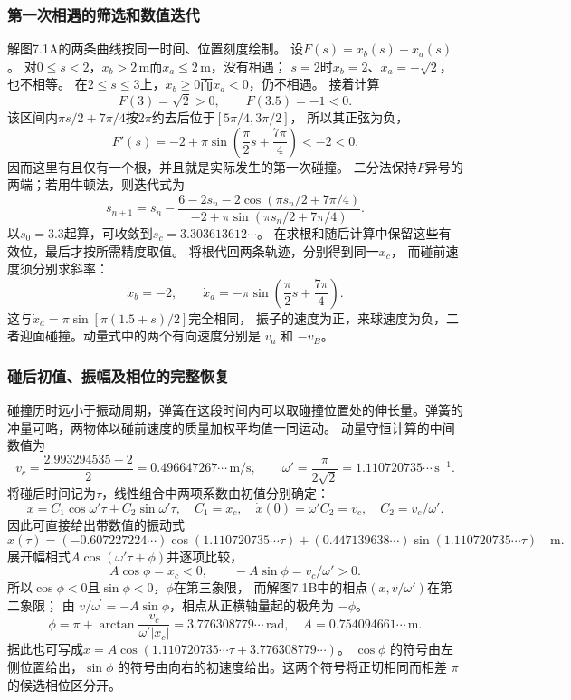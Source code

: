 \documentclass[UTF8,fontset=fandol,a4paper,11pt]{ctexart}
\begin{document}
\subsubsection*{第一次相遇的筛选和数值迭代}
解图7.1A的两条曲线按同一时间、位置刻度绘制。
设$F(s)=x_b(s)-x_a(s)$。
对$0\leq s<2$，$x_b>2\,\mathrm m$而$x_a\leq2\,\mathrm m$，没有相遇；
$s=2$时$x_b=2$、$x_a=-\sqrt2$，也不相等。
在$2\leq s\leq3$上，$x_b\geq0$而$x_a<0$，仍不相遇。
接着计算
\[
F(3)=\sqrt2>0,\qquad F(3.5)=-1<0.
\]
该区间内$\pi s/2+7\pi/4$按$2\pi$约去后位于$[5\pi/4,3\pi/2]$，
所以其正弦为负，
\[
F'(s)=-2+\pi\sin\left(\frac\pi2s+\frac{7\pi}4\right)<-2<0.
\]
因而这里有且仅有一个根，并且就是实际发生的第一次碰撞。
二分法保持$F$异号的两端；若用牛顿法，则迭代式为
\[
s_{n+1}=s_n-
\frac{6-2s_n-2\cos(\pi s_n/2+7\pi/4)}
{-2+\pi\sin(\pi s_n/2+7\pi/4)}.
\]
以$s_0=3.3$起算，可收敛到$s_c=3.303613612\cdots$。
在求根和随后计算中保留这些有效位，最后才按所需精度取值。
将根代回两条轨迹，分别得到同一$x_c$，
而碰前速度须分别求斜率：
\[
\dot x_b=-2,\qquad
\dot x_a=-\pi\sin\left(\frac\pi2s+\frac{7\pi}4\right).
\]
这与$\dot x_a=\pi\sin[\pi(1.5+s)/2]$完全相同，
振子的速度为正，来球速度为负，二者迎面碰撞。动量式中的两个有向速度分别是 $v_a$ 和 $-v_B$。

\subsubsection*{碰后初值、振幅及相位的完整恢复}
碰撞历时远小于振动周期，弹簧在这段时间内可以取碰撞位置处的伸长量。弹簧的冲量可略，两物体以碰前速度的质量加权平均值一同运动。
动量守恒计算的中间数值为
\[
v_c=\frac{2.993294535-2}{2}
=0.496647267\cdots\,\mathrm{m/s},
\qquad \omega'=\frac{\pi}{2\sqrt2}=1.110720735\cdots\,\mathrm{s}^{-1}.
\]
将碰后时间记为$\tau$，线性组合中两项系数由初值分别确定：
\[
x=C_1\cos\omega'\tau+C_2\sin\omega'\tau,
\quad C_1=x_c,
\quad \dot x(0)=\omega'C_2=v_c,
\quad C_2=v_c/\omega'.
\]
因此可直接给出带数值的振动式
\[
x(\tau)=
(-0.607227224\cdots)\cos(1.110720735\cdots\tau)
+(0.447139638\cdots)\sin(1.110720735\cdots\tau)
\quad\mathrm m.
\]
展开幅相式$A\cos(\omega'\tau+\phi)$并逐项比较，
\[
A\cos\phi=x_c<0,\qquad
-A\sin\phi=v_c/\omega'>0.
\]
所以$\cos\phi<0$且$\sin\phi<0$，$\phi$在第三象限，
而解图7.1B中的相点$(x,v/\omega')$在第二象限；
由 $v/\omega^{\prime}=-A\sin\phi$，相点从正横轴量起的极角为 $-\phi$。
\[
\phi=\pi+\arctan\frac{v_c}{\omega'|x_c|}
=3.776308779\cdots\,\mathrm{rad},
\quad A=0.754094661\cdots\,\mathrm m.
\]
据此也可写成$x=A\cos(1.110720735\cdots\tau+3.776308779\cdots)$。
$\cos\phi$ 的符号由左侧位置给出，$\sin\phi$ 的符号由向右的初速度给出。这两个符号将正切相同而相差 $\pi$ 的候选相位区分开。
\end{document}
